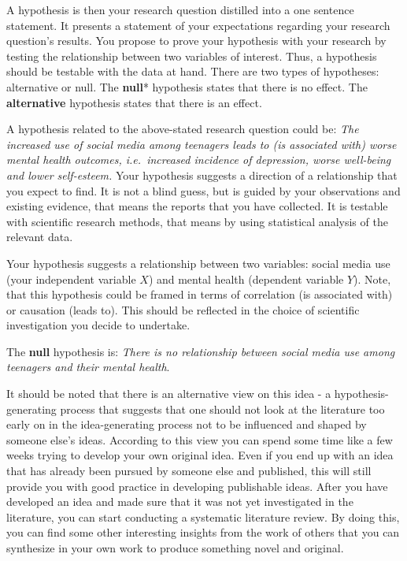 \documentclass[
]{book}
\begin{document}
A hypothesis is then your research question distilled into a one
sentence statement. It presents a statement of your expectations
regarding your research question's results. You propose to prove your
hypothesis with your research by testing the relationship between two
variables of interest. Thus, a hypothesis should be testable with the
data at hand. There are two types of hypotheses: alternative or null.
The \textbf{null}* hypothesis states that there is no effect. The
\textbf{alternative} hypothesis states that there is an effect.

A hypothesis related to the above-stated research question could be:
\emph{The increased use of social media among teenagers leads to (is
associated with) worse mental health outcomes, i.e.~increased incidence
of depression, worse well-being and lower self-esteem.} Your hypothesis
suggests a direction of a relationship that you expect to find. It is
not a blind guess, but is guided by your observations and existing
evidence, that means the reports that you have collected. It is testable
with scientific research methods, that means by using statistical
analysis of the relevant data.

Your hypothesis suggests a relationship between two variables: social
media use (your independent variable \(X\)) and mental health (dependent
variable \(Y\)). Note, that this hypothesis could be framed in terms of
correlation (is associated with) or causation (leads to). This should be
reflected in the choice of scientific investigation you decide to
undertake.

The \textbf{null} hypothesis is: \emph{There is no relationship between
social media use among teenagers and their mental health}.

It should be noted that there is an alternative view on this idea - a
hypothesis-generating process that suggests that one should not look at
the literature too early on in the idea-generating process not to be
influenced and shaped by someone else's ideas. According to this view
you can spend some time like a few weeks trying to develop your own
original idea. Even if you end up with an idea that has already been
pursued by someone else and published, this will still provide you with
good practice in developing publishable ideas. After you have developed
an idea and made sure that it was not yet investigated in the
literature, you can start conducting a systematic literature review. By
doing this, you can find some other interesting insights from the work
of others that you can synthesize in your own work to produce something
novel and original.
\end{document}
